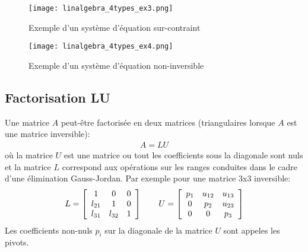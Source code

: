 \begin{example}
\begin{figure}[H]
	\centering
		\texttt{[image: linalgebra\_4types\_ex3.png]}
	\caption{Exemple d'un système d'équation sur-contraint}
	\label{fig:rmn_ex3}
\end{figure}
\end{example}

\begin{example}
\begin{figure}[H]
	\centering
		\texttt{[image: linalgebra\_4types\_ex4.png]}
	\caption{Exemple d'un système d'équation non-inversible}
	\label{fig:rmn_ex4}
\end{figure}
\end{example}


\subsection{Factorisation LU}
\label{sec:lu}

Une matrice $A$ peut-être factorisée en deux matrices (triangulaires lorsque $A$ est une matrice inversible):
%
\begin{align}
A = LU 
\end{align}
%
où la matrice $U$ est une matrice ou tout les coefficients sous la diagonale sont nuls et la matrice $L$ correspond aux opérations sur les ranges conduites dans le cadre d'une élimination Gauss-Jordan. Par exemple pour une matrice 3x3 inversible:
%
\begin{align}
L= 
\left[ \begin{array}{c c c } 
1      &   0       & 0   \\ 
l_{21} &   1       & 0   \\  
l_{31} & l_{32}    & 1
\end{array} \right]
\quad\quad
U = 
\left[ \begin{array}{c c c c c } 
p_{1} & u_{12} &  u_{13} \\ 
0     & p_{2}  &  u_{23}  \\ 
0     & 0      &  p_{3}
\end{array} \right]
\end{align}
%
Les coefficients non-nuls $p_i$ sur la diagonale de la matrice $U$ sont appeles les pivots.



